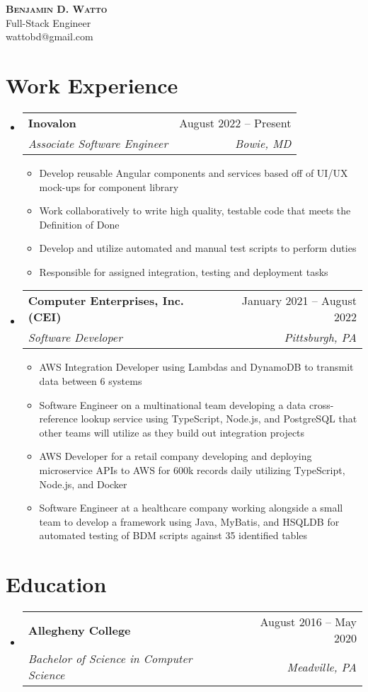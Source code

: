 \documentclass[letterpaper,12pt]{article}
\makeatletter
\newcommand{\resumeItem}[1]{
  \item\small{
    {#1 \vspace{-1pt}}
  }
}
\newcommand{\resumeSubheading}[4]{
  \vspace{2pt}\item
    \begin{tabular*}{0.97\textwidth}[t]{l@{\extracolsep{\fill}}r}
      \textbf{#1} & #2 \\
      \textit{\small#3} & \textit{\small #4} \\
    \end{tabular*}\vspace{-7pt}
}
\newcommand{\resumeSubHeadingListStart}{\begin{itemize}[leftmargin=0.15in, label={}]}
\newcommand{\resumeSubHeadingListEnd}{\end{itemize}}
\newcommand{\resumeItemListStart}{\begin{itemize}}
\newcommand{\resumeItemListEnd}{\end{itemize}\vspace{5pt}}
\makeatother
\begin{document}
\begin{flushleft}
  \textbf{\Huge \scshape Benjamin D. Watto } \\ \vspace{5pt}
  \small Full-Stack Engineer \\
  \small wattobd@gmail.com
\end{flushleft}


\section{Work Experience}
\resumeSubHeadingListStart
\resumeSubheading
{Inovalon}{August 2022 -- Present}
{Associate Software Engineer}{Bowie, MD}
\resumeItemListStart
\resumeItem{Develop reusable Angular components and services based off of UI/UX mock-ups for component library}
\resumeItem{Work collaboratively to write high quality, testable code that meets the Definition of Done}
\resumeItem{Develop and utilize automated and manual test scripts to perform duties}
\resumeItem{Responsible for assigned integration, testing and deployment tasks}
\resumeItemListEnd

\resumeSubheading
{Computer Enterprises, Inc. (CEI)}{January 2021 -- August 2022}
{Software Developer }{Pittsburgh, PA}
\resumeItemListStart
\resumeItem{AWS Integration Developer using Lambdas and DynamoDB to transmit data between 6 systems}
\resumeItem{Software Engineer on a multinational team developing a data cross-reference lookup service using TypeScript, Node.js, and PostgreSQL that other teams will utilize as they build out integration projects}
\resumeItem{AWS Developer for a retail company developing and deploying microservice APIs to AWS for 600k records daily utilizing TypeScript, Node.js, and Docker}
\resumeItem{Software Engineer at a healthcare company working alongside a small team to develop a framework using Java, MyBatis, and HSQLDB for automated testing of BDM scripts against 35 identified tables}
\resumeItemListEnd
\vspace{-12.5pt}
\resumeSubHeadingListEnd


\section{Education}
\resumeSubHeadingListStart
\resumeSubheading
{Allegheny College}{August 2016 -- May 2020}
{Bachelor of Science in Computer Science}{Meadville, PA}
\resumeSubHeadingListEnd
\end{document}
